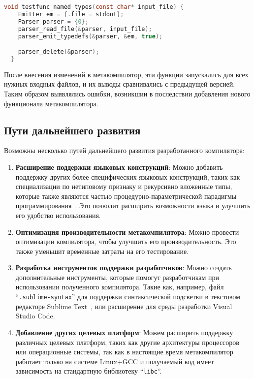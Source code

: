\begin{lstlisting}[language=c, caption={Пример тестирующей функции для парсера}, label={lst:testexample}]
  void testfunc_named_types(const char* input_file) {
    Emitter em = {.file = stdout};
    Parser parser = {0};
    parser_read_file(&parser, input_file);
    parser_emit_typedefs(&parser, &em, true);

    parser_delete(&parser);
  }
\end{lstlisting}

После внесения изменений в метакомпилятор, эти функции запускались для всех нужных входных файлов, и их выводы сравнивались с предыдущей версией.
Таким образом выявлялись ошибки, возникшии в последствии добавления нового функционала метакомпилятора.

\subsection{Пути дальнейшего развития}
Возможны несколько путей дальнейшего развития разработанного компилятора:
\begin{enumerate}
  \item \textbf{Расширение поддержки языковых конструкций}:
  Можно добавить поддержку других более специфических языковых конструкций, таких как специализации по нетиповому признаку и рекурсивно вложенные типы, которые также являются частью процедурно-параметрической парадигмы программирования~\cite{легалов2023расширение}.
  Это позволит расширить возможности языка и улучшить его удобство использования.

  \item \textbf{Оптимизация производительности метакомпилятора}:
  Можно провести оптимизации компилятора, чтобы улучшить его производительность. Это также уменьшит временные затраты на его тестирование.

  \item \textbf{Разработка инструментов поддержки разработчиков}:
  Можно создать дополнительные инструменты, которые помогут разработчикам при использовании полученного компилятора.
  Такие как, например, файл ``\texttt{.sublime-syntax}'' для поддержки синтаксической подсветки в текстовом редакторе Sublime Text~\cite{sublimetextSyntaxDefinitions}, или расширение для среды разработки Visual Studio Code.

  \item \textbf{Добавление других целевых платформ}:
  Можем расширить поддержку различных целевых платформ, таких как другие архитектуры процессоров или операционные системы, так как в настоящие время метакомпилятор работает только на системе Linux+GCC и получаемый код имеет зависимость на стандартную библиотеку ``\texttt{libc}''.
\end{enumerate}

